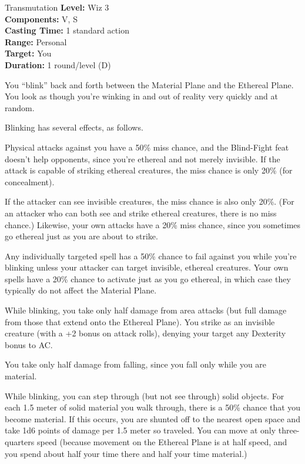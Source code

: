 {Transmutation}
{
	\textbf{Level:}
	Wiz 3\\
	\textbf{Components:}
	V, S\\
	\textbf{Casting Time:}
	1 standard action\\
	\textbf{Range:}
	Personal\\
	\textbf{Target:}
	You\\
	\textbf{Duration:}
	1 round/level (D)\\
}
{
	You ``blink'' back and forth between the Material Plane and the Ethereal Plane. You look as though you're winking in and out of reality very quickly and at random.

	Blinking has several effects, as follows.

	Physical attacks against you have a 50\% miss chance, and the Blind-Fight feat doesn't help opponents, since you're ethereal and not merely invisible. If the attack is capable of striking ethereal creatures, the miss chance is only 20\% (for concealment).

	If the attacker can see invisible creatures, the miss chance is also only 20\%. (For an attacker who can both see and strike ethereal creatures, there is no miss chance.) Likewise, your own attacks have a 20\% miss chance, since you sometimes go ethereal just as you are about to strike.

	Any individually targeted spell has a 50\% chance to fail against you while you're blinking unless your attacker can target invisible, ethereal creatures. Your own spells have a 20\% chance to activate just as you go ethereal, in which case they typically do not affect the Material Plane.

	While blinking, you take only half damage from area attacks (but full damage from those that extend onto the Ethereal Plane). You strike as an invisible creature (with a +2 bonus on attack rolls), denying your target any Dexterity bonus to AC.

	You take only half damage from falling, since you fall only while you are material.

	While blinking, you can step through (but not see through) solid objects. For each 1.5 meter of solid material you walk through, there is a 50\% chance that you become material. If this occurs, you are shunted off to the nearest open space and take 1d6 points of damage per 1.5 meter so traveled. You can move at only three-quarters speed (because movement on the Ethereal Plane is at half speed, and you spend about half your time there and half your time material.)

}
